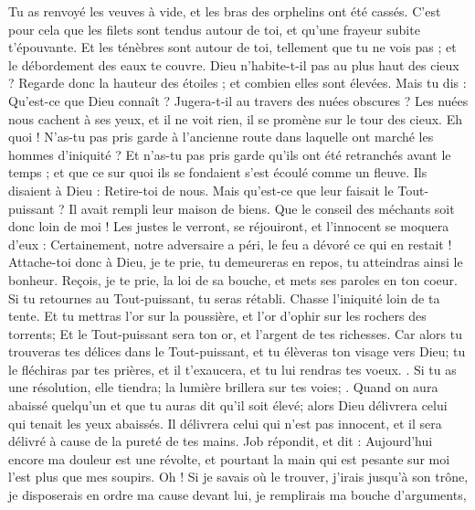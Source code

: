 \begin{multicols}{2}
{Tu as renvoyé les veuves à vide, et les bras des orphelins ont été cassés.
C'est pour cela que les filets sont tendus autour de toi, et qu'une frayeur subite t'épouvante. 
Et les ténèbres sont autour de toi, tellement que tu ne vois pas ; et le débordement des eaux te couvre.
Dieu n'habite-t-il pas au plus haut des cieux ? Regarde donc la hauteur des étoiles ; et combien elles sont élevées.
Mais tu dis : Qu'est-ce que Dieu connaît ? Jugera-t-il au travers des nuées obscures ? 
Les nuées nous cachent à ses yeux, et il ne voit rien, il se promène sur le tour des cieux. 
Eh quoi ! N'as-tu pas pris garde à l'ancienne route dans laquelle ont marché les hommes d'iniquité ?
Et n'as-tu pas pris garde qu'ils ont été retranchés avant le temps ; et que ce sur quoi ils se fondaient s'est écoulé comme un fleuve.
Ils disaient à Dieu : Retire-toi de nous. Mais qu'est-ce que leur faisait le Tout-puissant ?
Il avait rempli leur maison de biens. Que le conseil des méchants soit donc loin de moi !
Les justes le verront, se réjouiront, et l'innocent se moquera d'eux :
Certainement, notre adversaire a péri, le feu a dévoré ce qui en restait !
Attache-toi donc à Dieu, je te prie, tu demeureras en repos, tu atteindras ainsi le bonheur.
Reçois, je te prie, la loi de sa bouche, et mets ses paroles en ton coeur.
Si tu retournes au Tout-puissant, tu seras rétabli. Chasse l'iniquité loin de ta tente.
Et tu mettras l'or sur la poussière, et l'or d'ophir sur les rochers des torrents;
Et le Tout-puissant sera ton or, et l'argent de tes richesses.
Car alors tu trouveras tes délices dans le Tout-puissant, et tu élèveras ton visage vers Dieu; 
tu le fléchiras par tes prières, et il t'exaucera, et tu lui rendras tes voeux. .
Si tu as une résolution, elle tiendra; la lumière brillera sur tes voies; .
Quand on aura abaissé quelqu'un et que tu auras dit qu'il soit élevé; alors Dieu délivrera celui qui tenait les yeux abaissés.
Il délivrera celui qui n'est pas innocent, et il sera délivré à cause de la pureté de tes mains.
\VerseOne{}Job répondit, et dit :
Aujourd'hui encore ma douleur est une révolte, et pourtant la main qui est pesante sur moi l'est plus que mes soupirs.
Oh ! Si je savais où le trouver, j'irais jusqu'à son trône,
je disposerais en ordre ma cause devant lui, je remplirais ma bouche d'arguments,
}
\end{multicols}
